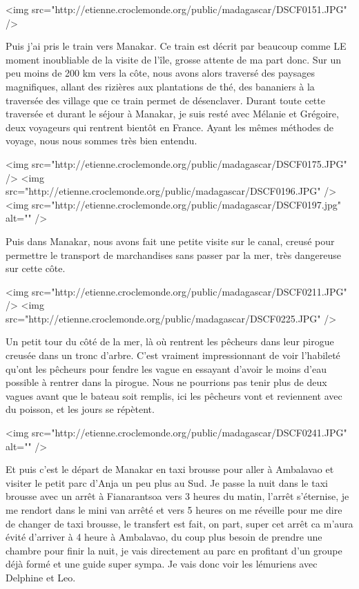 <img src="http://etienne.croclemonde.org/public/madagascar/DSCF0151.JPG" />

Puis j'ai pris le train vers Manakar. Ce train est décrit par beaucoup comme LE moment inoubliable de la visite de l'île, grosse attente de ma part donc. Sur un peu moins de 200 km vers la côte, nous avons alors traversé des paysages magnifiques, allant des rizières aux plantations de thé, des bananiers à la traversée des village que ce train permet de désenclaver. Durant toute cette traversée et durant le séjour à Manakar, je suis resté avec Mélanie et Grégoire, deux voyageurs qui rentrent bientôt en France. Ayant les mêmes méthodes de voyage, nous nous sommes très bien entendu.

<img src="http://etienne.croclemonde.org/public/madagascar/DSCF0175.JPG" />
<img src="http://etienne.croclemonde.org/public/madagascar/DSCF0196.JPG" />
<img src="http://etienne.croclemonde.org/public/madagascar/DSCF0197.jpg" alt="" />

Puis dans Manakar, nous avons fait une petite visite sur le canal, creusé pour permettre le transport de marchandises sans passer par la mer, très dangereuse sur cette côte.

<img src="http://etienne.croclemonde.org/public/madagascar/DSCF0211.JPG" />
<img src="http://etienne.croclemonde.org/public/madagascar/DSCF0225.JPG" />

Un petit tour du côté de la mer, là où rentrent les pêcheurs dans leur pirogue creusée dans un tronc d'arbre. C'est vraiment impressionnant de voir l'habileté qu'ont les pêcheurs pour fendre les vague en essayant d'avoir le moins d'eau possible à rentrer dans la pirogue. Nous ne pourrions pas tenir plus de deux vagues avant que le bateau soit remplis, ici les pêcheurs vont et reviennent avec du poisson, et les jours se répètent.

<img src="http://etienne.croclemonde.org/public/madagascar/DSCF0241.JPG" alt="" />

Et puis c'est le départ de Manakar en taxi brousse pour aller à Ambalavao et visiter le petit parc d'Anja un peu plus au Sud. Je passe la nuit dans le taxi brousse avec un arrêt à Fianarantsoa vers 3 heures du matin, l'arrêt s'éternise, je me rendort dans le mini van arrêté et vers 5 heures on me réveille pour me dire de changer de taxi brousse, le transfert est fait, on part, super cet arrêt ca m'aura évité d'arriver à 4 heure à Ambalavao, du coup plus besoin de prendre une chambre pour finir la nuit, je vais directement au parc en profitant d'un groupe déjà formé et une guide super sympa. Je vais donc voir les lémuriens avec Delphine et Leo.

